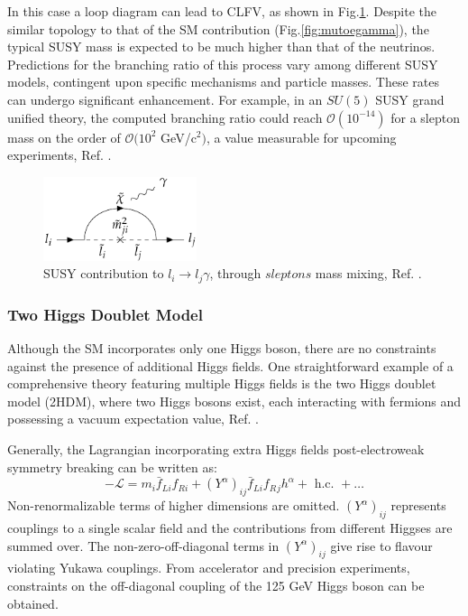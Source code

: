 In this case a loop diagram can lead to CLFV, as shown in Fig.\ref{fig:susy}. 
Despite the similar topology to that of the SM contribution (Fig.\ref{fig:mutoegamma}), 
the typical SUSY mass is expected to be much higher than that of the neutrinos. 
Predictions for the branching ratio of this process vary among different SUSY models, 
contingent upon specific mechanisms and particle masses. These rates can undergo 
significant enhancement. For example, in an $SU(5)$ SUSY grand unified theory, the 
computed branching ratio could reach $\mathcal{O}(10^{-14})$ for a 
slepton mass on the order of $\mathcal{O}(10^{2}$ GeV/c$^2)$, 
a value measurable for upcoming experiments, Ref. \cite{clfv_signorelli}.

\begin{figure}[!h]
\centering
\includegraphics[width =0.4\textwidth]{figures/png/Screenshot_20240218_105920.png}
\caption[SUSY contribution to $l_i \rightarrow l_j\gamma$.]{SUSY contribution to $l_i \rightarrow l_j\gamma$, through $sleptons$ mass mixing, Ref. \cite{universe8060299}.}
\label{fig:susy}
\end{figure}


\subsubsection{Two Higgs Doublet Model}\label{2higgs}
Although the SM incorporates only one Higgs boson, there are 
no constraints against the presence of additional Higgs fields. 
One straightforward example of a comprehensive theory featuring 
multiple Higgs fields is the two Higgs doublet model 
(2HDM), where two Higgs bosons exist, each interacting with 
fermions and possessing a vacuum expectation value, Ref. \cite{Harnik_2013}.

Generally, the Lagrangian incorporating extra Higgs fields post-electroweak symmetry breaking can be written as:
\begin{equation}
-\mathscr{L}=m_i \bar{f}_{L i} f_{R i}+\left(Y^\alpha\right)_{i j} \bar{f}_{L i} f_R{ }_j h^\alpha+\text { h.c. }+\ldots
\end{equation}
Non-renormalizable terms of higher dimensions are omitted. $(Y^\alpha)_{i j}$ represents couplings to a single scalar field and the contributions from different Higgses are summed over. The non-zero-off-diagonal terms in $(Y^\alpha)_{i j}$ give rise to flavour violating Yukawa couplings. From accelerator and precision experiments, constraints on the off-diagonal coupling of the 125 GeV Higgs boson can be obtained.
